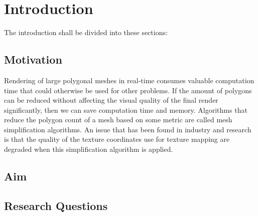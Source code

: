 

\chapter{Introduction}
\label{cha:introduction}

The introduction shall be divided into these sections:

\section{Motivation}
\label{sec:motivation}

\iffalse
This is where the studied problem is described from a general
point of view and put in a context which makes it clear that
it is interesting and well worth studying. The aim is to make
the reader interested in the work and create an urge to
continue reading.
\fi

Rendering of large polygonal meshes in real-time consumes valuable computation time that
could otherwise be used for other problems. If the amount of polygons can be reduced without
affecting the visual quality of the final render significantly, then we can save computation time
and memory. Algorithms that reduce the polygon count of a mesh based on some metric are
called mesh simplification algorithms. An issue that has been found in industry and research is
that the quality of the texture coordinates use for texture mapping are degraded when this
simplification algorithm is applied.

\section{Aim}
\label{sec:aim}

\iffalse
What is the underlying purpose of the thesis project?
\fi

\section{Research Questions}
\label{sec:research-questions}

